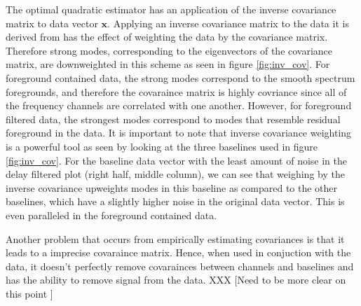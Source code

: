 \documentclass[twocolumn,numberedappendix]{emulateapj} \shorttitle{PSA64}
\newcommand{\x}{\mathbf{x}} \newcommand{\xhat}{\hat{\mathbf{x}}}
\begin{document}
The optimal quadratic estimator has an application of the inverse covariance
matrix to data vector $\x$. Applying an inverse covariance matrix to the data it
is derived from has the effect of weighting the data by the covariance matrix.
Therefore strong modes, corresponding to the eigenvectors of the covariance
matrix, are downweighted in this scheme as seen in figure \ref{fig:inv_cov}.
For foreground contained data, the strong modes correspond to the smooth
spectrum foregrounds, and therefore the covaraince matrix is highly covriance
since all of the frequency channels are correlated with one another. However,
for foreground filtered data, the strongest modes correspond to modes that
resemble residual foreground in the data. It is important to note that inverse
covariance weighting is a powerful tool as seen by looking at the three
baselines used in figure \ref{fig:inv_cov}. For the baseline data vector with
the least amount of noise in the delay filtered plot (right half, middle
column), we can see that weighing by the inverse covariance upweights modes in
this baseline as compared to the other baselines, which have a slightly higher
noise in the original data vector. This is even paralleled in the foreground
contained data.
%


Another problem that occurs from empirically estimating covariances is that it
leads to a imprecise covaraince matrix. Hence, when used in conjuction with the
data, it doesn't perfectly remove covarainces between channels and baselines and
has the ability to remove signal from the data. XXX [Need to be more clear on
this point ]


\end{document}
